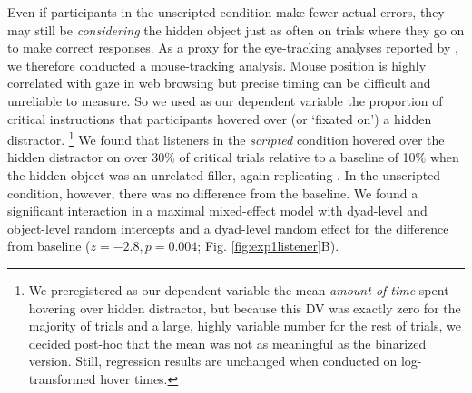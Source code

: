 \documentclass[manuscript]{stjour}
\begin{document}
Even if participants in the unscripted condition make fewer actual errors, they may still be \emph{considering} the hidden object just as often on trials where they go on to make correct responses. As a proxy for the eye-tracking analyses reported by \cite{KeysarLinBarr03_LimitsOnTheoryOfMindUse}, we therefore conducted a mouse-tracking analysis. Mouse position is highly correlated with gaze in web browsing \citep{ChenEtAl01_MouseCursor, SpiveyGrosjeanKnoblich05,RoddenEtAl08_EyeMouseCoordinationWebSearch} but precise timing can be difficult and unreliable to measure. 
So we used as our dependent variable the proportion of critical instructions that participants hovered over (or `fixated on') a hidden distractor.
\footnote{We preregistered as our dependent variable the mean \emph{amount of time} spent hovering over hidden distractor, but because this DV was exactly zero for the majority of trials and a large, highly variable number for the rest of trials, we decided post-hoc that the mean was not as meaningful as the binarized version. Still, regression results are unchanged when conducted on log-transformed hover times.} 
We found that listeners in the \emph{scripted} condition hovered over the hidden distractor on over 30\% of critical trials relative to a baseline of 10\% when the hidden object was an unrelated filler, again replicating \cite{KeysarLinBarr03_LimitsOnTheoryOfMindUse}. In the unscripted condition, however, there was no difference from the baseline. We found a significant interaction in a maximal mixed-effect model with dyad-level and object-level random intercepts and a dyad-level random effect for the difference from baseline ($z = -2.8, p = 0.004$; Fig. \ref{fig:exp1listener}B). %
\end{document}
